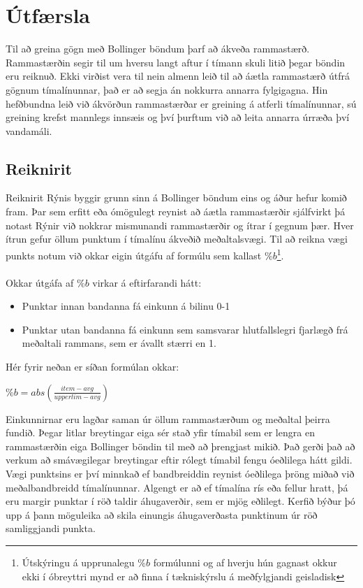 \documentclass{article}
\begin{document}
\section{Útfærsla}
\label{sec:imp_our}
Til að greina gögn með Bollinger böndum þarf að ákveða rammastærð.
Rammastærðin segir til um hversu langt aftur í tímann skuli litið þegar böndin eru reiknuð.
Ekki virðist vera til nein almenn leið til að áætla rammastærð útfrá gögnum tímalínunnar, það er að segja án 
nokkurra annarra fylgigagna.
Hin hefðbundna leið við ákvörðun rammastærðar er greining á atferli tímalínunnar, sú greining krefst mannlegs innsæis og því 
þurftum við að leita annarra úrræða því vandamáli.

\subsection{Reiknirit}
\label{sec:imp_algorithm}
Reiknirit Rýnis byggir grunn sinn á Bollinger böndum eins og áður hefur komið fram.
Þar sem erfitt eða ómögulegt reynist að áætla rammastærðir sjálfvirkt þá notast Rýnir við nokkrar mismunandi
rammastærðir og ítrar í gegnum þær. Hver ítrun gefur öllum punktum í tímalínu ákveðið meðaltalsvægi. Til að reikna
vægi punkts notum við okkar eigin útgáfu af formúlu sem kallast 
$\%b$\footnote[1]{Útskýringu á upprunalegu $\%b$ formúlunni og af hverju hún gagnast okkur ekki í óbreyttri mynd er að finna í tækniskýrslu á meðfylgjandi geisladisk}. 
\\ \hfil
\\ \hfil
Okkar útgáfa af $\%b$ virkar á eftirfarandi hátt:
\begin{itemize}
  \item Punktar innan bandanna fá einkunn á bilinu 0-1
  \item Punktar utan bandanna fá einkunn sem samsvarar hlutfallslegri fjarlægð frá meðaltali rammans, sem er ávallt stærri en 1.
\end{itemize}


Hér fyrir neðan er síðan formúlan okkar:


\begin{center}
  $\%b=abs(\frac{item - avg}{upperlim - avg})$
\end{center}

Einkunnirnar eru lagðar saman úr öllum rammastærðum og meðaltal þeirra fundið.
Þegar litlar breytingar eiga sér stað yfir tímabil sem er lengra en rammastærðin eiga
Bollinger böndin til með að þrengjast mikið. Það gerði það að verkum að smávægilegar breytingar eftir
rólegt tímabil fengu óeðlilega hátt gildi. 
Vægi punktsins er því minnkað ef bandbreiddin reynist óeðlilega þröng miðað við meðalbandbreidd
tímalínunnar.
Algengt er að ef tímalína rís eða fellur hratt, þá eru margir punktar í röð
taldir áhugaverðir, sem er mjög eðlilegt.
Kerfið býður þó upp á þann möguleika að skila einungis áhugaverðasta punktinum
úr röð samliggjandi punkta.
\end{document}
